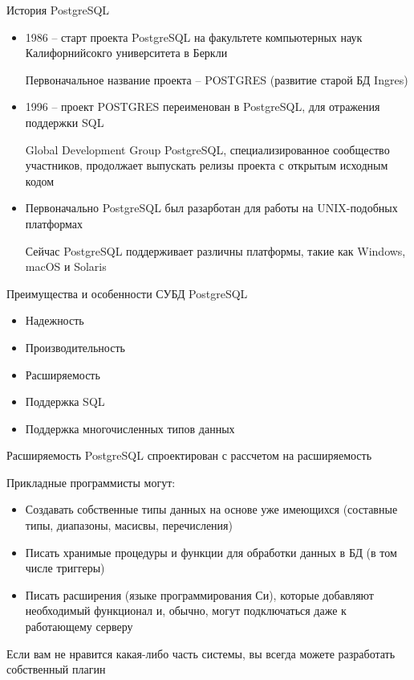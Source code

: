\documentclass[12pt]{article}
\begin{document}
\begin{nota}{История PostgreSQL}
    \begin{itemize}
        \item 1986 -- старт проекта PostgreSQL на факультете компьютерных наук Калифорнийсокго университета в Беркли
        
        Первоначальное название проекта -- POSTGRES (развитие старой БД Ingres)

        \item 1996 -- проект POSTGRES переименован в PostgreSQL, для отражения поддержки SQL
        
        Global Development Group PostgreSQL, специализированное сообщество участников, продолжает выпускать релизы проекта с открытым исходным кодом 

        \item Первоначально PostgreSQL был разарботан для работы на UNIX-подобных платформах
        
        Сейчас PostgreSQL поддерживает различны платформы, такие как Windows, macOS и Solaris
    \end{itemize}
\end{nota}

\begin{nota}{Преимущества и особенности СУБД PostgreSQL}
    \begin{itemize}
        \item Надежность
        \item Производительность
        \item Расширяемость
        \item Поддержка SQL
        \item Поддержка многочисленных типов данных
    \end{itemize}
\end{nota}

\begin{nota}{Расширяемость}
    PostgreSQL спроектирован с рассчетом на расширяемость 

    Прикладные программисты могут:

    \begin{itemize}
        \item Создавать собственные типы данных на основе уже имеющихся (составные типы, диапазоны, масисвы, перечисления)
        \item Писать хранимые процедуры и функции для обработки данных в БД (в том числе триггеры)
        \item Писать расширения (языке программирования Си), которые добавляют необходимый функционал и, обычно, могут подключаться даже к работающему серверу
    \end{itemize}

    Если вам не нравится какая-либо часть системы, вы всегда можете разработать собственный плагин
\end{nota}
\end{document}

